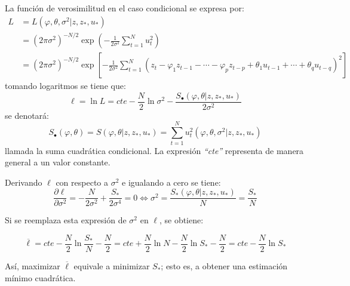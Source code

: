 La funci\'{o}n de verosimilitud en el caso condicional se expresa por:
\begin{align*}
 L
	&=L\left(\varphi ,\theta ,\sigma^{2}|z,z_{\ast } ,u_{\ast } \right)\\
	&=\left( 2\pi \sigma^{2} \right)^{-N/2}\exp \left(-\frac{1} {2 \sigma^{2}} \sum_{t=1}^N u_{t}^{2} \right) \\
	&=\left( {2\pi \sigma^{2}} \right)^{-N/2}\exp \left[ {-\frac{1}{2\sigma^{2}}\sum_{t=1}^N {\left( {z_{t} -\varphi_{1}z_{t-1} -\cdots -\varphi_{p} z_{t-p} +\theta_{1} u_{t-1} +\cdots +\theta_{q} u_{t-q} } \right)^{2}} } \right]
\end{align*}
tomando logaritmos se tiene que:
\[
\ell =\ln L=cte-\frac{N}{2}\ln\sigma^{2}-\frac{S_{\bullet } \left( {\varphi, \theta | {z,z_{\ast } ,u_{\ast } } } \right)}{2\sigma^{2}}
\]
se denotar\'{a}: 
\[
S_{\bullet } \left( {\varphi ,\theta } \right)=S\left( {\varphi, \theta | {z,z_{\ast } ,u_{\ast } }} \right)=\sum_{t=1}^N {u_{t}^{2} \left( {\varphi ,\theta ,\sigma ^{2}| {z,z_{\ast } ,u_{\ast } } } \right)} 
\]
llamada la suma cuadr\'{a}tica condicional. La expresi\'{o}n \emph{``cte''} representa de manera general a un valor constante.\newline

Derivando $\ell $ con respecto a $\sigma^{2}$ e igualando a cero se tiene:
\[
\frac{\partial \ell }{\partial \sigma^{2}}=-\frac{N}{2\sigma^{2}}+\frac{S_{\ast } }{2\sigma^{4}}=0\Longleftrightarrow \sigma^{2}=\frac{S_{\ast } \left( {\varphi ,\theta \left| {z,z_{\ast }, u_{\ast } } \right.} \right)}{N}=\frac{S_{\ast } }{N}
\]

Si se reemplaza esta expresi\'{o}n de $\sigma^{2}$ en $\ell$, se obtiene:

\[
\overline \ell =cte-\frac{N}{2}\ln\frac{S_{\ast } }{N}-\frac{N}{2}=cte+\frac{N}{2}\ln N-\frac{N}{2}\ln S_{\ast } -\frac{N}{2}=cte-\frac{N}{2}\ln S_{\ast } 
\]

As\'{i}, maximizar $\overline \ell $ equivale a minimizar $S_{\ast}$; esto es, a obtener una estimaci\'{o}n m\'{i}nimo cuadr\'{a}tica.

